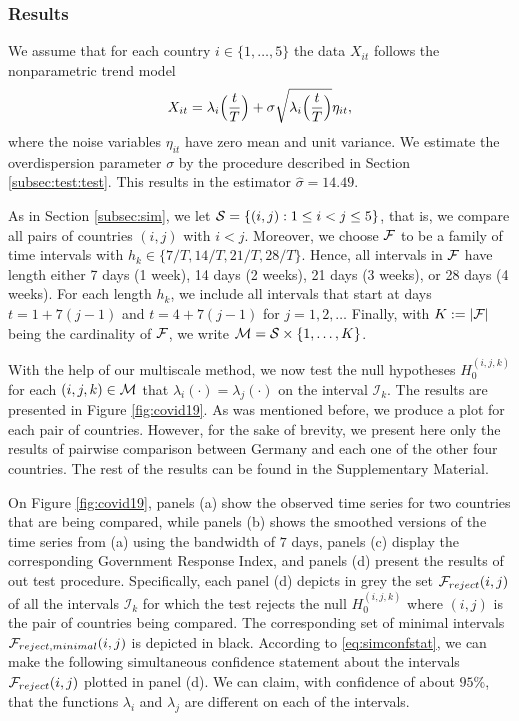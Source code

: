 \documentclass[a4paper,12pt]{article}
\numberwithin{equation}{section}
\begin{document}
\subsubsection{Results}

We assume that for each country $i \in \{1, \ldots, 5\}$ the data $X_{it}$ follows the nonparametric trend model \[ X_{it} = \lambda_i\Big(\frac{t}{T}\Big) + \sigma \sqrt{\lambda_i\Big(\frac{t}{T}\Big)} \eta_{it}, \]
where the noise variables $\eta_{it}$ have zero mean and unit variance. We estimate the overdispersion parameter $\sigma$ by the procedure described in Section \ref{subsec:test:test}. This results in the estimator $\widehat{\sigma} = 14.49$.

As in Section \ref{subsec:sim}, we let $\mathcal{S} = \{ (i,j): 1 \le i < j \le 5\}$, that is, we compare all pairs of countries $(i,j)$ with $i < j$. Moreover, we choose $\mathcal{F}$ to be a family of time intervals with $h_k \in \{ 7/T,14/T,21/T,28/T \}$. Hence, all intervals in $\mathcal{F}$ have length either 7 days (1 week), 14 days (2 weeks), 21 days (3 weeks), or 28 days (4 weeks). For each length $h_k$, we include all intervals that start at days $t = 1 + 7(j-1)$ and $t = 4 + 7(j-1)$ for $j=1,2,\ldots$ Finally, with $K := |\mathcal{F}|$ being the cardinality of $\mathcal{F}$, we write $\mathcal{M} = \mathcal{S} \times \{1, \ldots, K\}$.

With the help of our multiscale method, we now test the null hypotheses $H_0^{(i, j, k)}$ for each $(i, j, k) \in \mathcal{M}$ that $\lambda_i(\cdot) = \lambda_j(\cdot)$ on the interval $\mathcal{I}_k$. The results are presented in Figure \ref{fig:covid19}. As was mentioned before, we produce a plot for each pair of countries. However, for the sake of brevity, we present here only the results of pairwise comparison between Germany and each one of the other four countries. The rest of the results can be found in the Supplementary Material.

On Figure \ref{fig:covid19}, panels (a) show the observed time series for two countries that are being compared, while panels (b) shows the smoothed versions of the time series from (a) using the bandwidth of $7$ days, panels (c) display the corresponding Government Response Index, and panels (d) present the results of out test procedure. Specifically, each panel (d) depicts in grey the set $\mathcal{F}_{reject}(i, j)$ of all the intervals $\mathcal{I}_k$ for which the test rejects the null $H_0^{(i, j, k)}$ where $(i, j)$ is the pair of countries being compared. The corresponding set of minimal intervals $\mathcal{F}_{reject, minimal}(i, j)$ is depicted in black. According to \eqref{eq:simconfstat}, we can make the following simultaneous confidence statement about the intervals $\mathcal{F}_{reject}(i, j)$ plotted in panel (d). We can claim, with confidence of about $95\%$, that the functions $\lambda_i$ and $\lambda_j$ are different on each of the intervals.
\end{document}
